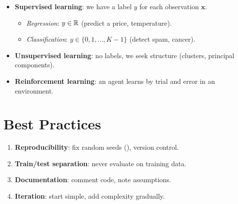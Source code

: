 \begin{center}
\end{center}

\begin{itemize}
\item \textbf{Supervised learning}: we have a label $y$ for each observation $\bm{x}$.
  \begin{itemize}
  \item \emph{Regression}: $y \in \mathbb{R}$ (predict a price, temperature).
  \item \emph{Classification}: $y \in \{0,1,\ldots,K-1\}$ (detect spam, cancer).
  \end{itemize}
\item \textbf{Unsupervised learning}: no labels, we seek structure (clusters, principal components).
\item \textbf{Reinforcement learning}: an agent learns by trial and error in an environment.
\end{itemize}

\section{Best Practices}

\begin{bestpractice}
\begin{enumerate}
\item \textbf{Reproducibility}: fix random seeds (), version control.
\item \textbf{Train/test separation}: never evaluate on training data.
\item \textbf{Documentation}: comment code, note assumptions.
\item \textbf{Iteration}: start simple, add complexity gradually.
\end{enumerate}
\end{bestpractice}

